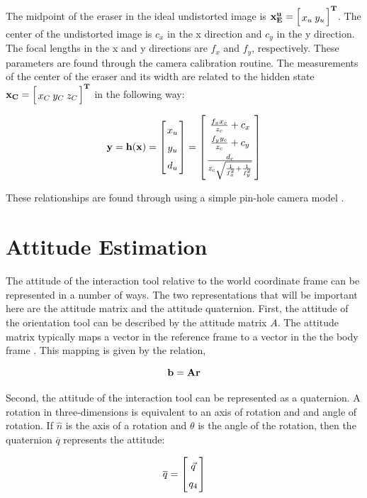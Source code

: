 \documentclass{article}
\newcommand{\mat}[2][ccccccccccccccccccccccccccccccccccccccccccccc]{\left[
        \arraycolsep=1.2pt\def\arraystretch{1.5}
        \begin{array}{#1} #2 \\ 
        \end{array} 
        \right]}
\begin{document}
\begin{flushleft}
\medskip

The midpoint of the eraser in the ideal undistorted image is $\bf{x^u_E} = \mat{ x_u & y_u }^{T}$. The center of the undistorted image is $c_x$ in the x direction and $c_y$ in the y direction. The focal lengths in the x and y directions are $f_x$ and $f_y$, respectively. These parameters are found through the camera calibration routine. The measurements of the center of the eraser and its width are related to the hidden state $\bf{\bf{x_C}} = \mat{ x_C & y_C & z_C }^{T}$ in the following way: 

\[
    \bf{\bf{y}} = h(\bf{\bf{x}})
        = \mat{x_u \\ y_u \\ d_{u} }
        = \mat{ \frac{f_x x_c}{z_c} + c_x \\ 
             \frac{f_y y_c}{z_c} + c_y \\ 
             \frac{d_c}{z_c \sqrt{\frac{1}{f_x^{2}} + \frac{1}{f_y^{2}}}}
           }
\]

These relationships are found through using a simple pin-hole camera model \cite{tsai_calibration}.

\section{Attitude Estimation}

The attitude of the interaction tool relative to the world coordinate frame can be represented in a number of ways. The two representations that will be important here are the attitude matrix and the attitude quaternion. First, the attitude of the orientation tool can be described by the attitude matrix $A$. The attitude matrix typically maps a vector in the reference frame to a vector in the the body frame \cite{Markley2007}. This mapping is given by the relation, 

\[ \bf{b} = A \bf{r} \]

Second, the attitude of the interaction tool can be represented as a quaternion. A rotation in three-dimensions is equivalent to an axis of rotation and and angle of rotation. If $\hat{n}$ is the axis of a rotation and $\theta$ is the angle of the rotation, then the quaternion $\overline{q}$ represents the attitude: 

\[ \overline{q} = \mat{\vec{q} \\ q_4} \] 


\end{flushleft}
\end{document}
